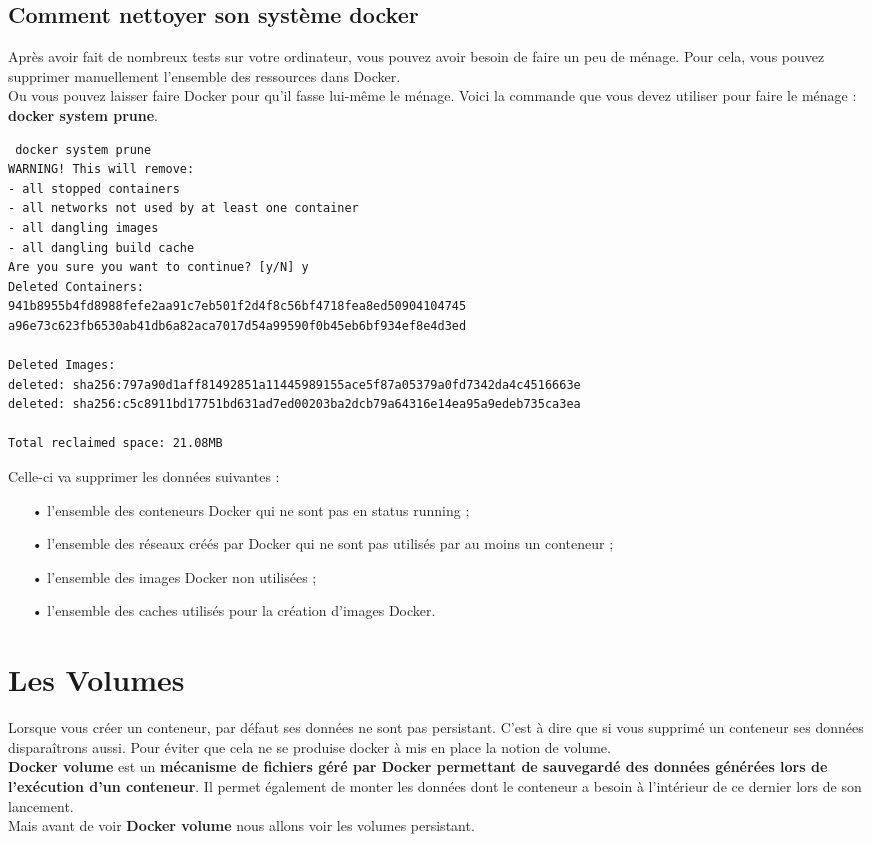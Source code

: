 \documentclass[12pt,a4paper]{article}
\begin{document}
\subsection{Comment nettoyer son système docker}
Après avoir fait de nombreux tests sur votre ordinateur, vous pouvez avoir besoin de faire un peu de ménage. Pour cela, vous pouvez supprimer manuellement l'ensemble des ressources dans Docker.\\
Ou vous pouvez laisser faire Docker pour qu'il fasse lui-même le ménage. Voici la commande que vous devez utiliser pour faire le ménage :  \textbf{docker system prune}.\\
\begin{verbatim}
 docker system prune
WARNING! This will remove:
- all stopped containers
- all networks not used by at least one container
- all dangling images
- all dangling build cache
Are you sure you want to continue? [y/N] y
Deleted Containers:
941b8955b4fd8988fefe2aa91c7eb501f2d4f8c56bf4718fea8ed50904104745
a96e73c623fb6530ab41db6a82aca7017d54a99590f0b45eb6bf934ef8e4d3ed

Deleted Images:
deleted: sha256:797a90d1aff81492851a11445989155ace5f87a05379a0fd7342da4c4516663e
deleted: sha256:c5c8911bd17751bd631ad7ed00203ba2dcb79a64316e14ea95a9edeb735ca3ea

Total reclaimed space: 21.08MB
\end{verbatim}
Celle-ci va supprimer les données suivantes :
\begin{itemize}
\item[•] l'ensemble des conteneurs Docker qui ne sont pas en status running ;
\item[•] l'ensemble des réseaux créés par Docker qui ne sont pas utilisés par au moins un conteneur ;
\item[•] l'ensemble des images Docker non utilisées ;
\item[•] l'ensemble des caches utilisés pour la création d'images Docker.
\end{itemize}

\section{Les Volumes}
Lorsque vous créer un conteneur, par défaut ses données ne sont pas
persistant. C'est à dire que si vous supprimé un conteneur ses
données disparaîtrons aussi. Pour éviter que cela ne se produise
docker à mis en place la notion de volume.\\
\textbf{Docker volume} est un \textbf{mécanisme de fichiers géré
par Docker permettant de sauvegardé des données générées lors de 
l'exécution d'un conteneur}. Il permet également de monter les données dont le conteneur a besoin à l'intérieur de ce dernier lors
de son lancement.\\
Mais avant de voir \textbf{Docker volume} nous allons voir les
volumes persistant.
\end{document}

